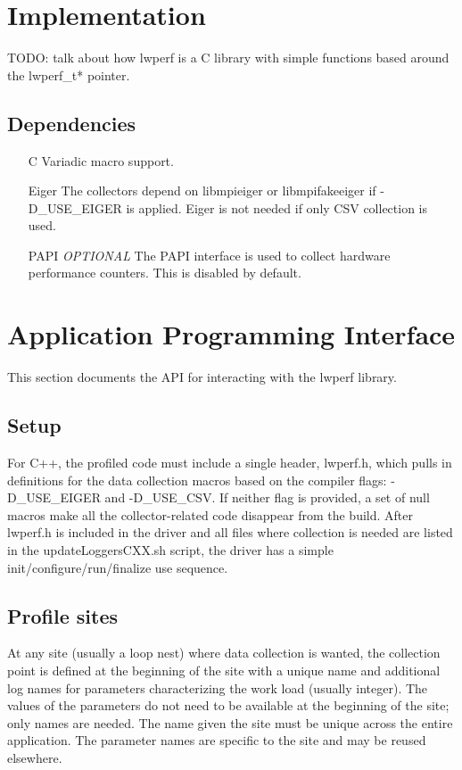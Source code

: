 \documentclass{article}
\begin{document}
\section{Implementation}
\label{sec:impl}
TODO: talk about how lwperf is a C library with simple functions based around the lwperf\_t* pointer.

\subsection{Dependencies}
\begin{itemize}
\item[C] Variadic macro support.
\item[Eiger] The collectors depend on libmpieiger or libmpifakeeiger if -D\_USE\_EIGER is applied. Eiger is not needed if only CSV collection is used.
\item[PAPI] \textit{OPTIONAL} The PAPI interface is used to collect hardware performance counters. This is disabled by default.
\end{itemize}

\section{Application Programming Interface}
This section documents the API for interacting with the lwperf library.

\subsection{Setup}
For C++, the profiled code must include a single header, lwperf.h, which pulls in definitions for the data collection macros based on the compiler flags: -D\_USE\_EIGER and -D\_USE\_CSV. If neither flag is provided, a set of null macros make all the collector-related code disappear from the build.
After lwperf.h is included in the driver and all files where collection is needed are listed in the updateLoggersCXX.sh script, the driver has a simple init/configure/run/finalize use sequence. 

\subsection{Profile sites}
At any site (usually a loop nest) where data collection is wanted, the collection point is defined at the beginning of the site with a unique name and additional log names for parameters characterizing the work load (usually integer). The values of the parameters do not need to be available at the beginning of the site; only names are needed. The name given the site must be unique across the entire application. The parameter names are specific to the site and may be reused elsewhere.
\end{document}
